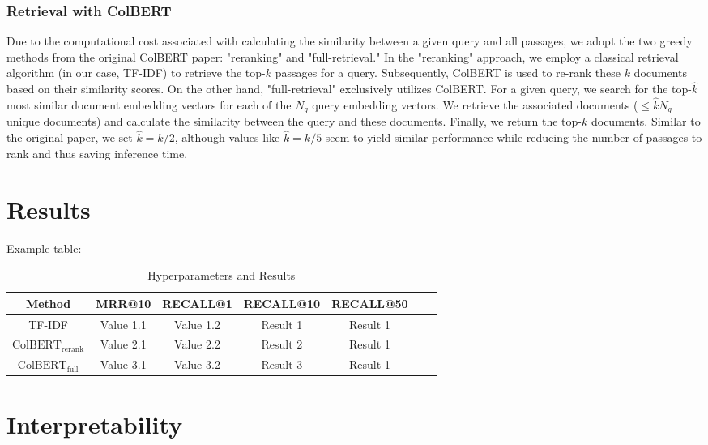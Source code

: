\documentclass{article}
\begin{document}
\subsubsection{Retrieval with ColBERT}
Due to the computational cost associated with calculating the similarity between a given query and all passages, we adopt the two greedy methods from the original ColBERT paper: "reranking" and "full-retrieval." In the "reranking" approach, we employ a classical retrieval algorithm (in our case, TF-IDF) to retrieve the top-$k$ passages for a query. Subsequently, ColBERT is used to re-rank these $k$ documents based on their similarity scores. On the other hand, "full-retrieval" exclusively utilizes ColBERT. For a given query, we search for the top-$\hat{k}$ most similar document embedding vectors for each of the $N_q$ query embedding vectors. We retrieve the associated documents ($\leq \hat{k}N_q$ unique documents) and calculate the similarity between the query and these documents. Finally, we return the top-$k$ documents. Similar to the original paper, we set $\hat{k} = k / 2$, although values like $\hat{k} = k / 5$ seem to yield similar performance while reducing the number of passages to rank and thus saving inference time.

\section{Results}


Example table:
\begin{table}[htbp]
    \centering
    \label{tab:hyperparameters}
    \begin{tabular}{ccccccc}
      \toprule
      \textbf{Method} & \textbf{MRR@10}  & \textbf{RECALL@1} & \textbf{RECALL@10} & \textbf{RECALL@50} \\
      \midrule
      TF-IDF & Value 1.1 & Value 1.2 & Result 1  & Result 1 \\
      $\text{ColBERT}_\text{rerank}$ & Value 2.1 & Value 2.2 & Result 2 & Result 1 \\
      $\text{ColBERT}_\text{full}$ & Value 3.1 & Value 3.2 & Result 3 & Result 1 \\
      \bottomrule
    \end{tabular}
    \caption{Hyperparameters and Results}
\end{table}

\section{Interpretability}
\end{document}
